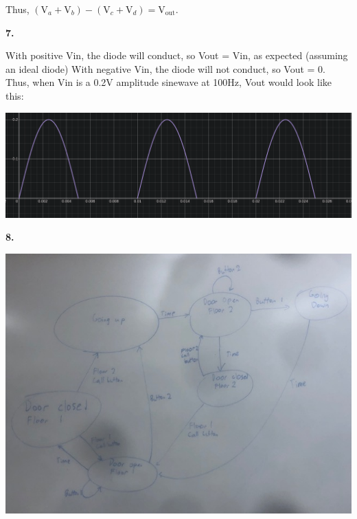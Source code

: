 \documentclass{article}
\begin{document}
    Thus, $(\text{V}_a + \text{V}_b) - (\text{V}_c + \text{V}_d) = \text{V}_{\text{out}}$.

\newpage\noindent\textbf{7.}

    With positive Vin, the diode will conduct, so Vout = Vin, as expected (assuming an ideal diode)
    With negative Vin, the diode will not conduct, so Vout = 0.
    Thus, when Vin is a 0.2V amplitude sinewave at 100Hz, Vout would look like this:
    \begin{center}\includegraphics[scale=.5]{3.png}\end{center}
    
\newpage\noindent\textbf{8.}

    \begin{center} \includegraphics[scale=.7]{4.jpg} \end{center}
\end{document}
